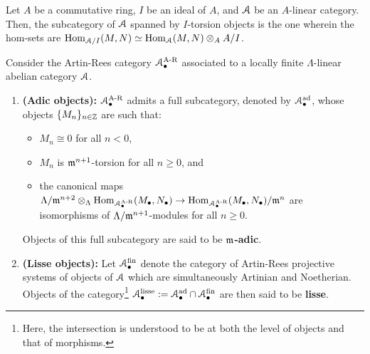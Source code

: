                 \begin{definition} \label{def: torsion_objects_in_tensor_categories}
                    Let $A$ be a commutative ring, $I$ be an ideal of $A$, and $\mathcal{A}$ be an $A$-linear category. Then, the subcategory of $\mathcal{A}$ spanned by $I$-torsion objects is the one wherein the hom-sets are $\Hom_{\calA/I}(M, N) \cong \Hom_\calA(M, N) \tensor_A A/I$.
                \end{definition}
                \begin{definition} \label{def: adic_objects_and_lisse_objects_of_artin_rees_categories}
                    Consider the Artin-Rees category $\mathcal{A}_{\bullet}^{\mathrm{A\text{-}R}}$ associated to a locally finite $\Lambda$-linear abelian category $\mathcal{A}$. 
                        \begin{enumerate}
                            \item \textbf{(Adic objects):} $\mathcal{A}_{\bullet}^{\mathrm{A\text{-}R}}$ admits a full subcategory, denoted by $\mathcal{A}_{\bullet}^{\mathrm{ad}}$, whose objects $\{M_n\}_{n \in \mathbb{Z}}$ are such that:
                                \begin{itemize}
                                    \item $M_n \cong 0$ for all $n < 0$,
                                    \item $M_n$ is $\mathfrak{m}^{n + 1}$-torsion for all $n \geq 0$, and
                                    \item the canonical maps $\Lambda/\m^{n + 2} \tensor_{\Lambda} \Hom_{\calA_{\bullet}^{\AR}}(M_{\bullet}, N_{\bullet}) \to \Hom_{\calA_{\bullet}^{\AR}}(M_{\bullet}, N_{\bullet})/\m^n$ are isomorphisms of $\Lambda/\mathfrak{m}^{n + 1}$-modules for all $n \geq 0$.
                                \end{itemize}
                            Objects of this full subcategory are said to be \textbf{$\mathfrak{m}$-adic}.
                            \item \textbf{(Lisse objects):} Let $\mathcal{A}_{\bullet}^{\mathrm{fin}}$ denote the category of Artin-Rees projective systems of objects of $\mathcal{A}$ which are simultaneously Artinian and Noetherian. Objects of the category\footnote{Here, the intersection is understood to be at both the level of objects and that of morphisms.} $\mathcal{A}_{\bullet}^{\mathrm{lisse}} := \mathcal{A}_{\bullet}^{\mathrm{ad}} \cap \mathcal{A}_{\bullet}^{\mathrm{fin}}$ are then said to be \textbf{lisse}. 
                        \end{enumerate}
                \end{definition}
